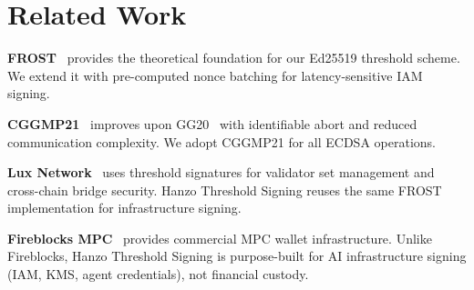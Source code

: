 \section{Related Work}

\label{sec:related}

\textbf{FROST}~\cite{frost} provides the theoretical foundation for our Ed25519
threshold scheme. We extend it with pre-computed nonce batching for
latency-sensitive IAM signing.

\textbf{CGGMP21}~\cite{cggmp21} improves upon GG20~\cite{gg20} with
identifiable abort and reduced communication complexity. We adopt CGGMP21 for
all ECDSA operations.

\textbf{Lux Network}~\cite{luxwhitepaper} uses threshold signatures for
validator set management and cross-chain bridge security. Hanzo Threshold
Signing reuses the same FROST implementation for infrastructure signing.

\textbf{Fireblocks MPC}~\cite{fireblocks} provides commercial MPC wallet
infrastructure. Unlike Fireblocks, Hanzo Threshold Signing is purpose-built for
AI infrastructure signing (IAM, KMS, agent credentials), not financial custody.

